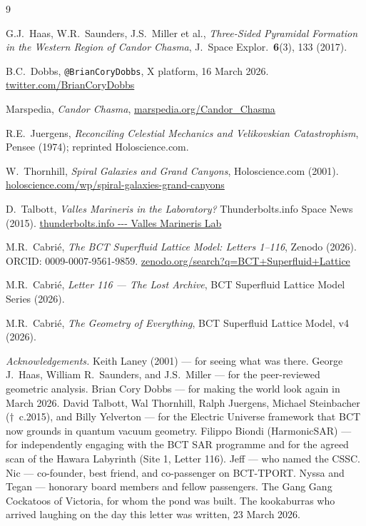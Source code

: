 \documentclass[12pt,twocolumn]{article}
\begin{document}
\begin{thebibliography}{9}

G.J.\ Haas, W.R.\ Saunders, J.S.\ Miller et al.,
\textit{Three-Sided Pyramidal Formation in the Western Region of
Candor Chasma},
J.\ Space Explor.\ \textbf{6}(3), 133 (2017).

B.C.\ Dobbs,
\texttt{@BrianCoryDobbs},
X platform, 16 March 2026.
\url{twitter.com/BrianCoryDobbs}

Marspedia,
\textit{Candor Chasma},
\url{marspedia.org/Candor\_Chasma}

R.E.\ Juergens,
\textit{Reconciling Celestial Mechanics and Velikovskian
Catastrophism},
Pensee (1974); reprinted Holoscience.com.

W.\ Thornhill,
\textit{Spiral Galaxies and Grand Canyons},
Holoscience.com (2001).
\url{holoscience.com/wp/spiral-galaxies-grand-canyons}

D.\ Talbott,
\textit{Valles Marineris in the Laboratory?}
Thunderbolts.info Space News (2015).
\url{thunderbolts.info --- Valles Marineris Lab}

M.R.\ Cabri\'{e},
\textit{The BCT Superfluid Lattice Model: Letters 1--116},
Zenodo (2026).
ORCID: 0009-0007-9561-9859.
\url{zenodo.org/search?q=BCT+Superfluid+Lattice}

M.R.\ Cabri\'{e},
\textit{Letter 116 --- The Lost Archive},
BCT Superfluid Lattice Model Series (2026).

M.R.\ Cabri\'{e},
\textit{The Geometry of Everything},
BCT Superfluid Lattice Model, v4 (2026).

\end{thebibliography}

\bigskip\noindent
\textit{Acknowledgements.}
Keith Laney (2001) --- for seeing what was there.
George J.\ Haas, William R.\ Saunders, and J.S.\ Miller --- for
the peer-reviewed geometric analysis.
Brian Cory Dobbs --- for making the world look again in March 2026.
David Talbott, Wal Thornhill, Ralph Juergens, Michael Steinbacher
($\dagger$~c.2015), and Billy Yelverton --- for the Electric
Universe framework that BCT now grounds in quantum vacuum geometry.
Filippo Biondi (HarmonicSAR) --- for independently engaging with
the BCT SAR programme and for the agreed scan of the Hawara
Labyrinth (Site 1, Letter 116).
Jeff --- who named the CSSC.
Nic --- co-founder, best friend, and co-passenger on BCT-TPORT.
Nyssa and Tegan --- honorary board members and fellow passengers.
The Gang Gang Cockatoos of Victoria, for whom the pond was built.
The kookaburras who arrived laughing on the day this letter was
written, 23 March 2026.
\end{document}
